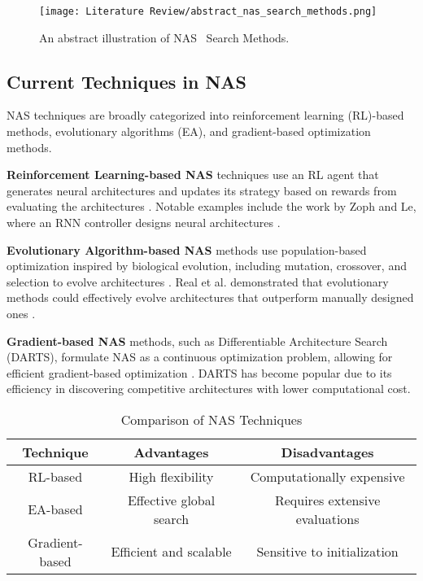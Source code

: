 \begin{figure}[h!]
    \centering
    \texttt{[image: Literature Review/abstract\_nas\_search\_methods.png]}
    \caption{An abstract illustration of NAS~\cite{elsken2019neural} Search Methods.}
    \label{fig:abstractNASMethods}
\end{figure}

\subsection{Current Techniques in NAS}

NAS techniques are broadly categorized into reinforcement learning (RL)-based methods, evolutionary algorithms (EA), and gradient-based optimization methods.

\textbf{Reinforcement Learning-based NAS} techniques use an RL agent that generates neural architectures and updates its strategy based on rewards from evaluating the architectures \cite{zoph2016neural}. Notable examples include the work by Zoph and Le, where an RNN controller designs neural architectures \cite{zoph2016neural}.

\textbf{Evolutionary Algorithm-based NAS} methods use population-based optimization inspired by biological evolution, including mutation, crossover, and selection to evolve architectures \cite{real2019regularized}. Real et al. demonstrated that evolutionary methods could effectively evolve architectures that outperform manually designed ones \cite{real2019regularized}.

\textbf{Gradient-based NAS} methods, such as Differentiable Architecture Search (DARTS), formulate NAS as a continuous optimization problem, allowing for efficient gradient-based optimization \cite{liu2018darts}. DARTS has become popular due to its efficiency in discovering competitive architectures with lower computational cost.

\begin{table}[ht]
\centering
\caption{Comparison of NAS Techniques}
\begin{tabular}{|c|c|c|}
\hline
\textbf{Technique} & \textbf{Advantages} & \textbf{Disadvantages} \\
\hline
RL-based & High flexibility & Computationally expensive \\
\hline
EA-based & Effective global search & Requires extensive evaluations \\
\hline
Gradient-based & Efficient and scalable & Sensitive to initialization \\
\hline
\end{tabular}
\label{tab:nas_techniques}
\end{table}

